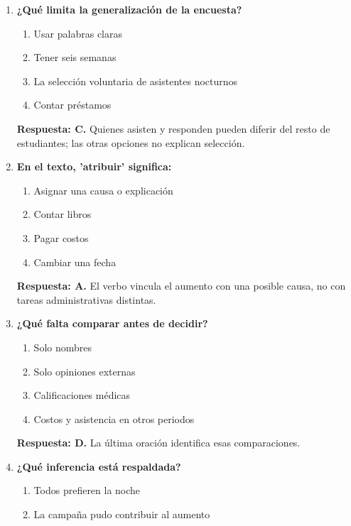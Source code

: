 \begin{enumerate}
\begin{enumerate}[label=\Alph*)]
\item Cerrar definitivamente
\item Mantener el horario durante exámenes
\item Eliminar encuestas
\item Aumentar cuotas de inmediato
\end{enumerate}
\textbf{Respuesta: B.} La propuesta es específica para exámenes; no se anuncia cierre ni cuotas.
\item\textbf{¿Qué limita la generalización de la encuesta?}
\begin{enumerate}[label=\Alph*)]
\item Usar palabras claras
\item Tener seis semanas
\item La selección voluntaria de asistentes nocturnos
\item Contar préstamos
\end{enumerate}
\textbf{Respuesta: C.} Quienes asisten y responden pueden diferir del resto de estudiantes; las otras opciones no explican selección.
\item\textbf{En el texto, 'atribuir' significa:}
\begin{enumerate}[label=\Alph*)]
\item Asignar una causa o explicación
\item Contar libros
\item Pagar costos
\item Cambiar una fecha
\end{enumerate}
\textbf{Respuesta: A.} El verbo vincula el aumento con una posible causa, no con tareas administrativas distintas.
\item\textbf{¿Qué falta comparar antes de decidir?}
\begin{enumerate}[label=\Alph*)]
\item Solo nombres
\item Solo opiniones externas
\item Calificaciones médicas
\item Costos y asistencia en otros periodos
\end{enumerate}
\textbf{Respuesta: D.} La última oración identifica esas comparaciones.
\item\textbf{¿Qué inferencia está respaldada?}
\begin{enumerate}[label=\Alph*)]
\item Todos prefieren la noche
\item La campaña pudo contribuir al aumento

\end{enumerate}
\end{enumerate}
